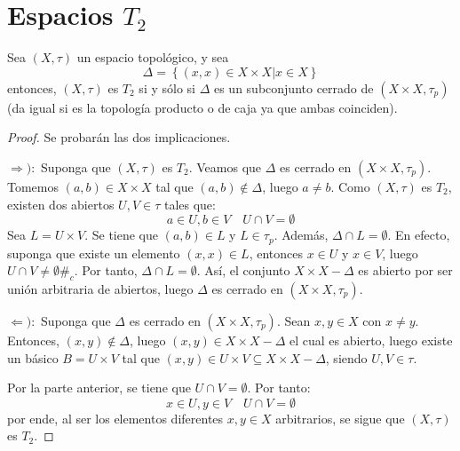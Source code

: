 \documentclass[12pt]{report}
\theoremstyle{largebreak}
\newcommand\contradiction{\ensuremath{\#_c}}
\begin{document}
    \section{Espacios $T_2$}

    \begin{propo}
        Sea $(X,\tau)$ un espacio topológico, y sea
        \begin{equation*}
            \Delta=\left\{(x,x)\in X\times X\Big|x\in X \right\}
        \end{equation*}
        entonces, $(X,\tau)$ es $T_2$ si y sólo si $\Delta$ es un subconjunto cerrado de $(X\times X,\tau_p)$ (da igual si es la topología producto o de caja ya que ambas coinciden).
    \end{propo}

    \begin{proof}
        Se probarán las dos implicaciones.

        $\Rightarrow):$ Suponga que $(X,\tau)$ es $T_2$. Veamos que $\Delta$ es cerrado en $(X\times X,\tau_p)$. Tomemos $(a,b)\in X\times X$ tal que $(a,b)\notin\Delta$, luego $a\neq b$. Como $(X,\tau)$ es $T_2$, existen dos abiertos $U,V\in\tau$ tales que:
        \begin{equation*}
            a\in U,b\in V\quad U\cap V=\emptyset
        \end{equation*}
        Sea $L=U\times V$. Se tiene que $(a,b)\in L$ y $L\in\tau_p$. Además, $\Delta\cap L=\emptyset$. En efecto, suponga que existe un elemento $(x,x)\in L$, entonces $x\in U$ y $x\in V$, luego $U\cap V\neq\emptyset$\contradiction. Por tanto, $\Delta\cap L=\emptyset$. Así, el conjunto $X\times X-\Delta$ es abierto por ser unión arbitraria de abiertos, luego $\Delta$ es cerrado en $(X\times X,\tau_p)$.

        $\Leftarrow):$ Suponga que $\Delta$ es cerrado en $(X\times X,\tau_p)$. Sean $x,y\in X$ con $x\neq y$. Entonces, $(x,y)\notin\Delta$, luego $(x,y)\in X\times X-\Delta$ el cual es abierto, luego existe un básico $B=U\times V$ tal que $(x,y)\in U\times V\subseteq X\times X-\Delta$, siendo $U,V\in\tau$.

        Por la parte anterior, se tiene que $U\cap V=\emptyset$. Por tanto:
        \begin{equation*}
            x\in U,y\in V\quad U\cap V=\emptyset
        \end{equation*}
        por ende, al ser los elementos diferentes $x,y\in X$ arbitrarios, se sigue que $(X,\tau)$ es $T_2$.
    \end{proof}
\end{document}
